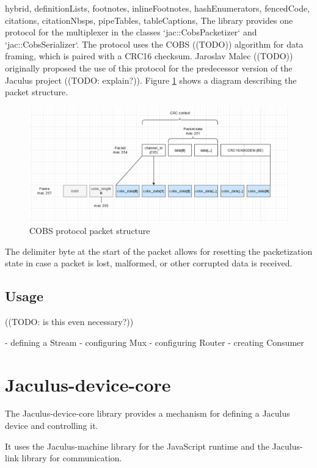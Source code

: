 \documentclass[
  digital,
  oneside,
  nosansbold,
  nocolorbold,
  lof,
  lot
]{fithesis4}
\begin{document}
\begin{markdown*}{%
  hybrid,
  definitionLists,
  footnotes,
  inlineFootnotes,
  hashEnumerators,
  fencedCode,
  citations,
  citationNbsps,
  pipeTables,
  tableCaptions,
}
The library provides one protocol for the multiplexer in the classes `jac::CobsPacketizer` and `jac::CobsSerializer`. The protocol uses the COBS ((TODO)) algorithm for data framing, which is paired with a CRC16 checksum.  Jaroslav Malec ((TODO)) originally proposed the use of this protocol for the predecessor version of the Jaculus project ((TODO: explain?)). Figure \ref{fig:cobs-diagram} shows a diagram describing the packet structure.

\begin{figure}[ht]
    \centering
    \includegraphics[width=\textwidth]{cobs-diagram}
    \caption{COBS protocol packet structure}
    \label{fig:cobs-diagram}
\end{figure}

The delimiter byte at the start of the packet allows for resetting the packetization state in case a packet is lost, malformed, or other corrupted data is received.


\section{Usage}

((TODO: is this even necessary?))

  - defining a Stream
  - configuring Mux
  - configuring Router
  - creating Consumer


\chapter{Jaculus-device-core}

The Jaculus-device-core library provides a mechanism for defining a Jaculus device and controlling it.

It uses the Jaculus-machine library for the JavaScript runtime and the Jaculus-link library for communication.



\end{markdown*}
\end{document}
